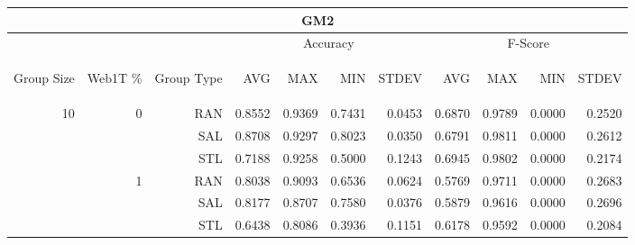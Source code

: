 \begin{center}
\begin{table}[htbp]
\begin{tabular}{ | r | r | r | r | r | r | r | r | r | r | r |}
\hline
\multicolumn{11}{|c|}{GM2}\\
\hline
 & & & \multicolumn{4}{|c|}{Accuracy} & \multicolumn{4}{|c|}{F-Score}\\ \cline{4-11}
\begin{sideways}Group Size\end{sideways} & \begin{sideways}Web1T \%\end{sideways} & \begin{sideways}Group Type\end{sideways} & \begin{sideways}AVG\end{sideways} & \begin{sideways}MAX\end{sideways} & \begin{sideways}MIN\end{sideways} & \begin{sideways}STDEV\end{sideways} & \begin{sideways}AVG\end{sideways} & \begin{sideways}MAX\end{sideways} & \begin{sideways}MIN\end{sideways} & \begin{sideways}STDEV\end{sideways}\\
\hline
\multirow{18}{*}{10}
 & \multirow{3}{*}{0} & RAN & 0.8552 & 0.9369 & 0.7431 & 0.0453 & 0.6870 & 0.9789 & 0.0000 & 0.2520\\ \cline{3-11}
 &   & SAL & 0.8708 & 0.9297 & 0.8023 & 0.0350 & 0.6791 & 0.9811 & 0.0000 & 0.2612\\ \cline{3-11}
 &   & STL & 0.7188 & 0.9258 & 0.5000 & 0.1243 & 0.6945 & 0.9802 & 0.0000 & 0.2174\\ \cline{2-11}
 & \multirow{3}{*}{1} & RAN & 0.8038 & 0.9093 & 0.6536 & 0.0624 & 0.5769 & 0.9711 & 0.0000 & 0.2683\\ \cline{3-11}
 &   & SAL & 0.8177 & 0.8707 & 0.7580 & 0.0376 & 0.5879 & 0.9616 & 0.0000 & 0.2696\\ \cline{3-11}
 &   & STL & 0.6438 & 0.8086 & 0.3936 & 0.1151 & 0.6178 & 0.9592 & 0.0000 & 0.2084\\ \cline{2-11}

\end{tabular}
\end{table}
\end{center}
